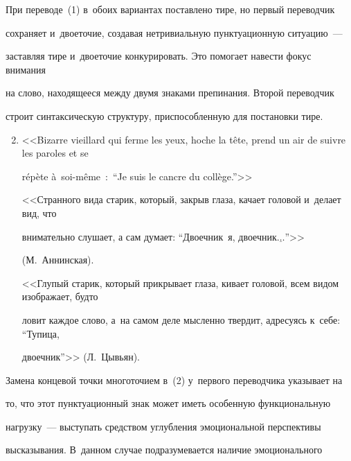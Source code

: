   


  При переводе~(1) в~обоих вариантах поставлено тире, но первый переводчик 


сохраняет и~двоеточие, создавая нетривиальную пунктуационную ситуацию~--- 


заставляя тире и~двоеточие конкурировать. Это помогает навести фокус внимания 


на слово, находящееся между двумя знаками препинания. Второй переводчик 


строит синтаксическую структуру, приспособленную для постановки тире.


  


  \begin{enumerate}[(1)]


  \setcounter{enumi}{1}


  \item 


  <<Bizarre vieillard qui ferme les yeux, hoche la t\^{e}te, prend un air de suivre les paroles et se 


r\'{e}p\`{e}te \`{a}~soi-m\^{e}me~:\ ``Je suis le cancre du coll\`{e}ge.''>>


  


  <<Странного вида старик, который, закрыв глаза, качает головой и~делает вид, что 


внимательно слушает, а сам думает: ``Двоечник~я, двоечник$\underline{\ldots}$''>> 


(М.~Аннинская).


  


  <<Глупый старик, который прикрывает глаза, кивает головой, всем видом изображает, будто 


ловит каждое слово, а~на самом деле мысленно твердит, адресуясь к~себе: ``Тупица, 


двоечник''>> (Л.~Цывьян).


  \end{enumerate}


  


  Замена концевой точки многоточием в~(2) у~первого переводчика указывает на 


то, что этот пунктуационный знак может иметь особенную функциональную 


нагрузку~--- выступать средством углубления эмоциональной перспективы 


высказывания. В~данном случае подразумевается наличие эмоционального 


